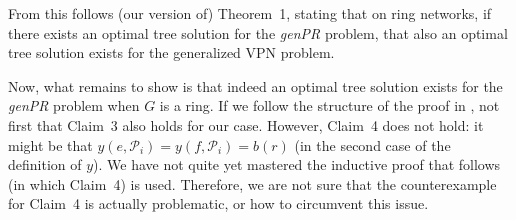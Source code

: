 From this follows (our version of) Theorem~1, stating that on ring networks, if there exists an optimal tree solution for the \emph{genPR} problem, that also an optimal tree solution exists for the generalized VPN problem.

Now, what remains to show is that indeed an optimal tree solution exists for the \emph{genPR} problem when $G$ is a ring.
If we follow the structure of the proof in \cite{grandoni2008short}, not first that Claim~3 also holds for our case.
However, Claim~4 does not hold: it might be that $y(e, \mathcal P_i) = y(f, \mathcal P_i) = b(r)$ (in the second case of the definition of $y$).
We have not quite yet mastered the inductive proof that follows (in which Claim~4) is used.
Therefore, we are not sure that the counterexample for Claim~4 is actually problematic, or how to circumvent this issue.
